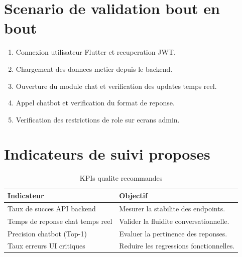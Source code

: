 \section{Scenario de validation bout en bout}

\begin{enumerate}[leftmargin=*]
  \item Connexion utilisateur Flutter et recuperation JWT.
  \item Chargement des donnees metier depuis le backend.
  \item Ouverture du module chat et verification des updates temps reel.
  \item Appel chatbot et verification du format de reponse.
  \item Verification des restrictions de role sur ecrans admin.
\end{enumerate}

\section{Indicateurs de suivi proposes}

\begin{table}[H]
\centering
\begin{tabular}{p{} p{}}
\toprule
\textbf{Indicateur} & \textbf{Objectif} \\
\midrule
Taux de succes API backend & Mesurer la stabilite des endpoints. \\
Temps de reponse chat temps reel & Valider la fluidite conversationnelle. \\
Precision chatbot (Top-1) & Evaluer la pertinence des reponses. \\
Taux erreurs UI critiques & Reduire les regressions fonctionnelles. \\
\bottomrule
\end{tabular}
\caption{KPIs qualite recommandes}
\end{table}
